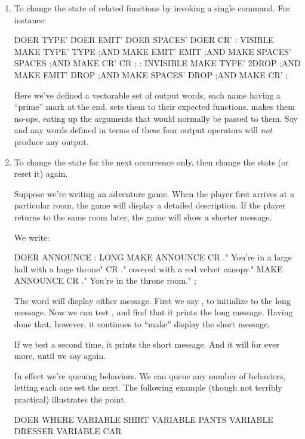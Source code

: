 \begin{enumerate}
\item To change the state of related functions by invoking a single
command. For instance:

\begin{Code}
DOER TYPE'
DOER EMIT'
DOER SPACES'
DOER CR'
: VISIBLE     MAKE TYPE'  TYPE ;AND
              MAKE EMIT'  EMIT ;AND
              MAKE SPACES'  SPACES ;AND
              MAKE CR'  CR ;
: INVISIBLE   MAKE TYPE'  2DROP ;AND
              MAKE EMIT'  DROP ;AND
              MAKE SPACES'  DROP ;AND
              MAKE CR'  ;
\end{Code}
Here we've defined a vectorable set of output words, each name having
a ``prime'' mark at the end.  sets them to their
expected functions.   makes them no-ops, eating up
the arguments that would normally be passed to them. Say
 and any words defined in terms of these four output
operators will \emph{not} produce any output.

\item To change the state for the next occurrence only, then change
the state (or reset it) again.

Suppose we're writing an adventure game. When the player first arrives
at a particular room, the game will display a detailed description. If
the player returns to the same room later, the game will show a
shorter message.

\goodbreak
We write:
\begin{Code}
DOER ANNOUNCE
: LONG MAKE ANNOUNCE
   CR ." You're in a large hall with a huge throne"
   CR ." covered with a red velvet canopy."
         MAKE ANNOUNCE
   CR ." You're in the throne room." ;
\end{Code}
The word  will display either message. First we say
, to initialize  to the long message. Now we
can test , and find that it prints the long message.
Having done that, however, it continues to ``make'' 
display the short message.

If we test  a second time, it prints the short message.
And it will for ever more, until we say  again.

In effect we're queuing behaviors. We can queue any number of behaviors,
letting each one set the next. The following example (though not terribly
practical) illustrates the point.

\begin{Code}
DOER WHERE
VARIABLE SHIRT
VARIABLE PANTS
VARIABLE DRESSER
VARIABLE CAR


\end{Code}
\end{enumerate}
